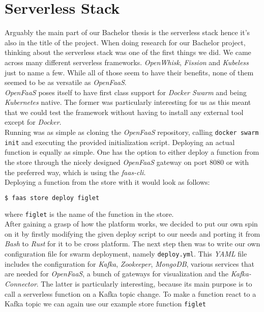 \section{Serverless Stack}

Arguably the main part of our Bachelor thesis is the serverless stack hence it's also in the title of the project. When doing research for our Bachelor project, thinking about the serverless stack was one of the first things we did. We came across many different serverless frameworks. \textit{OpenWhisk}, \textit{Fission} and \textit{Kubeless} just to name a few. While all of those seem to have their benefits, none of them seemed to be as versatile as \textit{OpenFaaS}. \\
\textit{OpenFaaS} poses itself to have first class support for \textit{Docker Swarm} and being \textit{Kubernetes} native. The former was particularly interesting for us as this meant that we could test the framework without having to install any external tool except for  \textit{Docker}. \\
Running was as simple as cloning the \textit{OpenFaaS} repository, calling \texttt{docker swarm init} and executing the provided initialization script. Deploying an actual function is equally as simple. One has the option to either deploy a function from the store through the nicely designed  \textit{OpenFaaS} gateway on port 8080 or with the preferred way, which is using the \textit{faas-cli}. \\

Deploying a function from the store with it would look as follows:

\begin{lstlisting}[language=bash]
  $ faas store deploy figlet
\end{lstlisting}

where \texttt{figlet} is the name of the function in the store.\\

After gaining a grasp of how the platform works, we decided to put our own spin on it by firstly modifying the given deploy script to our needs and porting it from \textit{Bash} to \textit{Rust} for it to be cross platform. The next step then was to write our own configuration file for swarm deployment, namely \texttt{deploy.yml}. This \textit{YAML} file includes the configuration for \textit{Kafka}, \textit{Zookeeper}, \textit{MongoDB}, various services that are needed for \textit{OpenFaaS}, a bunch of gateways for visualization and the \textit{Kafka-Connector}. The latter is particularly interesting, because its main purpose is to call a serverless function on a Kafka topic change. To make a function react to a Kafka topic we can again use our example store function \texttt{figlet}

